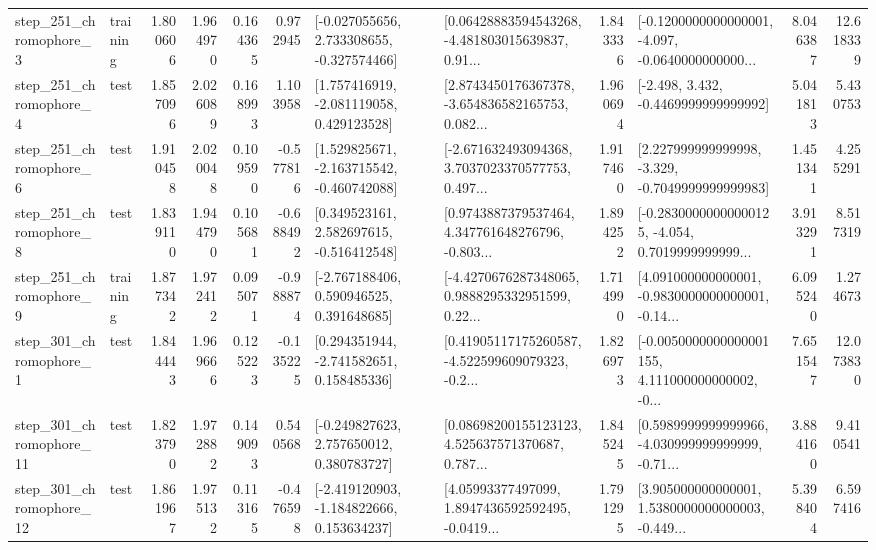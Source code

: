 \begin{tabular}{llrrrrllrlrr}
   step\_251\_chromophore\_3 &  training &      1.800606 &    1.964970 &      0.164365 &  0.972945 &   [-0.027055656, 2.733308655, -0.327574466] &  [0.06428883594543268, -4.481803015639837, 0.91... &       1.843336 &  [-0.1200000000000001, -4.097, -0.0640000000000... &            8.046387 &         12.618339 \\
   step\_251\_chromophore\_4 &      test &      1.857096 &    2.026089 &      0.168993 &  1.103958 &    [1.757416919, -2.081119058, 0.429123528] &  [2.8743450176367378, -3.654836582165753, 0.082... &       1.960694 &               [-2.498, 3.432, -0.4469999999999992] &            5.041813 &          5.430753 \\
   step\_251\_chromophore\_6 &      test &      1.910458 &    2.020048 &      0.109590 & -0.577816 &   [1.529825671, -2.163715542, -0.460742088] &  [-2.671632493094368, 3.7037023370577753, 0.497... &       1.917460 &   [2.227999999999998, -3.329, -0.7049999999999983] &            1.451341 &          4.255291 \\
   step\_251\_chromophore\_8 &      test &      1.839110 &    1.944790 &      0.105681 & -0.688492 &    [0.349523161, 2.582697615, -0.516412548] &  [0.9743887379537464, 4.347761648276796, -0.803... &       1.894252 &  [-0.28300000000000125, -4.054, 0.7019999999999... &            3.913291 &          8.517319 \\
   step\_251\_chromophore\_9 &  training &      1.877342 &    1.972412 &      0.095071 & -0.988874 &    [-2.767188406, 0.590946525, 0.391648685] &  [-4.4270676287348065, 0.9888295332951599, 0.22... &       1.714990 &  [4.091000000000001, -0.9830000000000001, -0.14... &            6.095240 &          1.274673 \\
   step\_301\_chromophore\_1 &      test &      1.844443 &    1.969666 &      0.125223 & -0.135225 &    [0.294351944, -2.741582651, 0.158485336] &  [0.41905117175260587, -4.522599609079323, -0.2... &       1.826973 &  [-0.0050000000000001155, 4.111000000000002, -0... &            7.651547 &         12.073830 \\
  step\_301\_chromophore\_11 &      test &      1.823790 &    1.972882 &      0.149093 &  0.540568 &    [-0.249827623, 2.757650012, 0.380783727] &  [0.08698200155123123, 4.525637571370687, 0.787... &       1.845245 &  [0.5989999999999966, -4.030999999999999, -0.71... &            3.884160 &          9.410541 \\
  step\_301\_chromophore\_12 &      test &      1.861967 &    1.975132 &      0.113165 & -0.476598 &   [-2.419120903, -1.184822666, 0.153634237] &  [4.05993377497099, 1.8947436592592495, -0.0419... &       1.791295 &  [3.905000000000001, 1.5380000000000003, -0.449... &            5.398404 &          6.597416 \\

\end{tabular}
